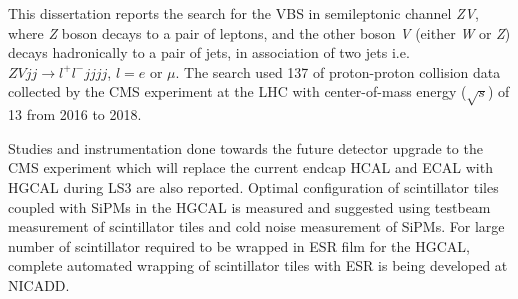 This dissertation reports the search for
the \gls{VBS} in semileptonic channel \textit{ZV},
where \textit{Z} boson decays to a pair of leptons,
and the other boson \textit{V} (either \textit{W} or \textit{Z})
decays hadronically to a pair of jets, in association of two jets
i.e.~\( \textit{ZV}jj \rightarrow l^{+}l^-jjjj \), \( l=e \) or \( \mu \).
The search used 137 \fbinv{} of proton-proton collision data collected by
the \gls{CMS} experiment at the \gls{LHC} with
center-of-mass energy (\( \sqrt{s} \)) of 13 \TeV{} from 2016 to 2018.


Studies and instrumentation done towards the future detector
upgrade to the \gls{CMS} experiment which will replace
the current endcap \gls{HCAL} and \gls{ECAL} with \gls{HGCAL}
during \gls{LS3} are also reported.
Optimal configuration
of scintillator tiles coupled with \glspl{SiPM}
in the \gls{HGCAL} is measured and suggested using testbeam measurement of
scintillator tiles and cold noise measurement of \glspl{SiPM}.
For large number of scintillator required to
be wrapped in \gls{ESR} film for the \gls{HGCAL},
complete automated wrapping of scintillator tiles with
\gls{ESR} is being developed at \gls{NICADD}.
